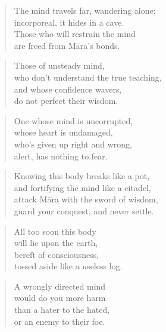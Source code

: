 \documentclass[12pt,openany]{book}%
\begin{document}
\begin{verse}%
The mind travels far, wandering alone; \\
incorporeal, it hides in a cave. \\
Those who will restrain the mind \\
are freed from \textsanskrit{Māra}’s bonds. 

%
\end{verse}

\begin{verse}%
Those of unsteady mind, \\
who don’t understand the true teaching, \\
and whose confidence wavers, \\
do not perfect their wisdom. 

%
\end{verse}

\begin{verse}%
One whose mind is uncorrupted, \\
whose heart is undamaged, \\
who’s given up right and wrong, \\
alert, has nothing to fear. 

%
\end{verse}

\begin{verse}%
Knowing this body breaks like a pot, \\
and fortifying the mind like a citadel, \\
attack \textsanskrit{Māra} with the sword of wisdom, \\
guard your conquest, and never settle. 

%
\end{verse}

\begin{verse}%
All too soon this body \\
will lie upon the earth, \\
bereft of consciousness, \\
tossed aside like a useless log. 

%
\end{verse}

\begin{verse}%
A wrongly directed mind \\
would do you more harm \\
than a hater to the hated, \\
or an enemy to their foe. 

%
\end{verse}
\end{document}
